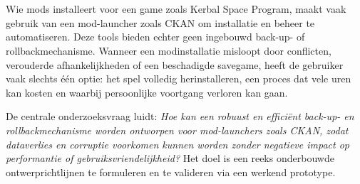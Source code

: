 
%
%
%
%
%



\chapter*{}

Wie mods installeert voor een game zoals Kerbal Space Program, maakt vaak gebruik van een mod-launcher zoals CKAN om installatie en beheer te automatiseren. Deze tools bieden echter geen ingebouwd back-up- of rollbackmechanisme. Wanneer een modinstallatie misloopt door conflicten, verouderde afhankelijkheden of een beschadigde savegame, heeft de gebruiker vaak slechts één optie: het spel volledig herinstalleren, een proces dat vele uren kan kosten en waarbij persoonlijke voortgang verloren kan gaan.

De centrale onderzoeksvraag luidt: \textit{Hoe kan een robuust en efficiënt back-up- en rollbackmechanisme worden ontworpen voor mod-launchers zoals CKAN, zodat dataverlies en corruptie voorkomen kunnen worden zonder negatieve impact op performantie of gebruiksvriendelijkheid?} Het doel is een reeks onderbouwde ontwerprichtlijnen te formuleren en te valideren via een werkend prototype.

